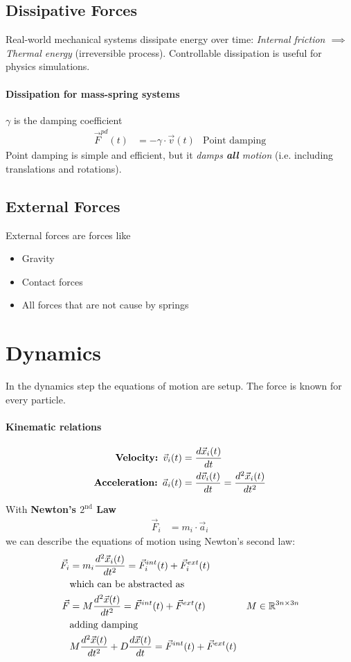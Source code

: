 \begin{multicols}{2}
\subsection{Dissipative Forces}
Real-world mechanical systems dissipate energy over time: \emph{Internal friction $\implies$  Thermal energy} (irreversible process). Controllable dissipation is useful for physics simulations. 
\paragraph{Dissipation for mass-spring systems} $\gamma$ is the damping coefficient
\begin{align*}
\vec F^{pd} (t) &= -\gamma\cdot \vec v(t) &\text{Point damping}
\end{align*}
Point damping is simple and efficient, but it \emph{damps \textbf{all} motion} (i.e. including translations and rotations).

\subsection{External Forces}
External forces are forces like
\begin{itemize}
	\item Gravity
	\item Contact forces
	\item All forces that are not cause by springs
\end{itemize}

\section{Dynamics}
In the dynamics step the equations of motion are setup. The force is known for every particle.
    \paragraph{Kinematic relations}
		\begin{align*}
			\textbf{Velocity: }\vec v_i(t) &= {d \vec x_i (t) \over dt}\\
			\textbf{Acceleration: }\vec a_i(t) &= {d\vec v_i(t) \over dt} = {d^2 \vec x_i(t) \over dt^2}
		\end{align*}

With \textbf{Newton's $2^\text{nd}$ Law} 
\begin{align*}
\vec F_i &=m_i \cdot \vec a_i
\end{align*}
we can describe the equations of motion using Newton's second law:
\begin{align*}
	\vec F_i &= m_i {d^2 \vec x_i (t) \over d t^2} = \vec F_i^{int}(t) + \vec F_i^{ext}(t)\\
	&\text{which can be abstracted as}\\
	\vec F  &= M {d^2 \vec x (t) \over d t^2} = \vec F^{int}(t) + \vec F^{ext}(t) & M \in \mathbb{R}^{3n\times 3n}\\
	&\text{adding damping}\\
&	M {d^2 \vec x (t) \over d t^2} + D {d\vec x(t) \over dt}= \vec F^{int}(t) + \vec F^{ext}(t)
\end{align*}


\end{multicols}
